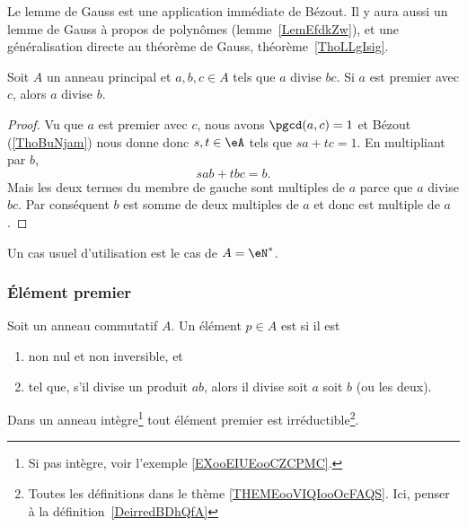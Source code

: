 Le lemme de Gauss est une application immédiate de Bézout. Il y aura aussi un lemme de Gauss à propos de polynômes (lemme~\ref{LemEfdkZw}), et une généralisation directe au théorème de Gauss, théorème~\ref{ThoLLgIsig}.
\begin{lemma}    \label{LemSdnZNX}
    Soit \( A\) un anneau principal et \( a,b,c\in A\) tels que \( a\) divise \( bc\). Si \( a\) est premier avec \( c\), alors \( a\) divise \( b\).
\end{lemma}

\begin{proof}
    Vu que \( a\) est premier avec \( c\), nous avons \( \pgcd(a,c)=1\) et Bézout (\ref{ThoBuNjam}) nous donne donc \( s,t\in \eA\) tels que \( sa+tc=1\). En multipliant par \( b\),
    \begin{equation}
        sab+tbc=b.
    \end{equation}
    Mais les deux termes du membre de gauche sont multiples de \( a\) parce que \( a\) divise \( bc\). Par conséquent \( b\) est somme de deux multiples de \( a\) et donc est multiple de \( a\).
\end{proof}
Un cas usuel d'utilisation est le cas de \( A=\eN^*\).

\subsubsection{Élément premier}

\begin{definition}       \label{DEFooZCRQooWXRalw}
    Soit un anneau commutatif \( A\). Un élément \( p\in A\) est  si il est
    \begin{enumerate}
        \item
            non nul et non inversible, et
        \item       \label{ITEMooPMTTooCVHPIm}
            tel que, s'il divise un produit \( ab\), alors il divise soit \( a\) soit \( b\) (ou les deux).
    \end{enumerate}
\end{definition}

\begin{proposition}     \label{PROPooWMNPooZdvOBt}
    Dans un anneau intègre\footnote{Si pas intègre, voir l'exemple \ref{EXooEIUEooCZCPMC}.} tout élément premier est irréductible\footnote{Toutes les définitions dans le thème \ref{THEMEooVIQIooOcFAQS}. Ici, penser à la définition~\ref{DeirredBDhQfA}}.
\end{proposition}
    
